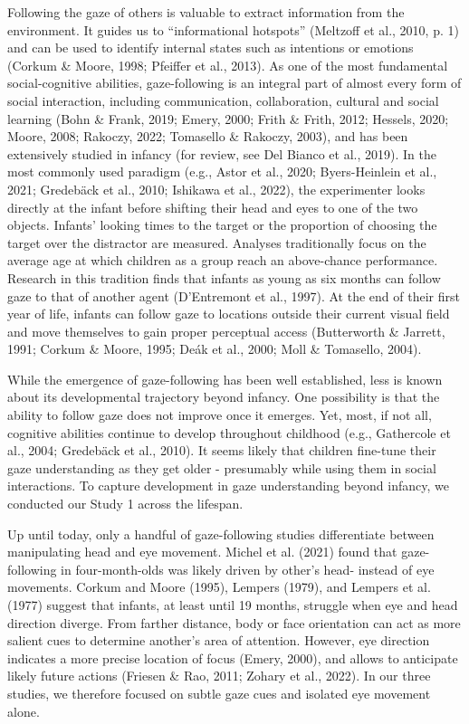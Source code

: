 \documentclass[
  man,mask,floatsintext]{apa7}
\begin{document}
Following the gaze of others is valuable to extract information from the environment. It guides us to ``informational hotspots'' (Meltzoff et al., 2010, p. 1) and can be used to identify internal states such as intentions or emotions (Corkum \& Moore, 1998; Pfeiffer et al., 2013). As one of the most fundamental social-cognitive abilities, gaze-following is an integral part of almost every form of social interaction, including communication, collaboration, cultural and social learning (Bohn \& Frank, 2019; Emery, 2000; Frith \& Frith, 2012; Hessels, 2020; Moore, 2008; Rakoczy, 2022; Tomasello \& Rakoczy, 2003), and has been extensively studied in infancy (for review, see Del Bianco et al., 2019). In the most commonly used paradigm (e.g., Astor et al., 2020; Byers-Heinlein et al., 2021; Gredebäck et al., 2010; Ishikawa et al., 2022), the experimenter looks directly at the infant before shifting their head and eyes to one of the two objects. Infants' looking times to the target or the proportion of choosing the target over the distractor are measured. Analyses traditionally focus on the average age at which children as a group reach an above-chance performance. Research in this tradition finds that infants as young as six months can follow gaze to that of another agent (D'Entremont et al., 1997). At the end of their first year of life, infants can follow gaze to locations outside their current visual field and move themselves to gain proper perceptual access (Butterworth \& Jarrett, 1991; Corkum \& Moore, 1995; Deák et al., 2000; Moll \& Tomasello, 2004).

While the emergence of gaze-following has been well established, less is known about its developmental trajectory beyond infancy. One possibility is that the ability to follow gaze does not improve once it emerges. Yet, most, if not all, cognitive abilities continue to develop throughout childhood (e.g., Gathercole et al., 2004; Gredebäck et al., 2010). It seems likely that children fine-tune their gaze understanding as they get older - presumably while using them in social interactions. To capture development in gaze understanding beyond infancy, we conducted our Study 1 across the lifespan.

Up until today, only a handful of gaze-following studies differentiate between manipulating head and eye movement. Michel et al. (2021) found that gaze-following in four-month-olds was likely driven by other's head- instead of eye movements. Corkum and Moore (1995), Lempers (1979), and Lempers et al. (1977) suggest that infants, at least until 19 months, struggle when eye and head direction diverge. From farther distance, body or face orientation can act as more salient cues to determine another's area of attention. However, eye direction indicates a more precise location of focus (Emery, 2000), and allows to anticipate likely future actions (Friesen \& Rao, 2011; Zohary et al., 2022). In our three studies, we therefore focused on subtle gaze cues and isolated eye movement alone.
\end{document}
